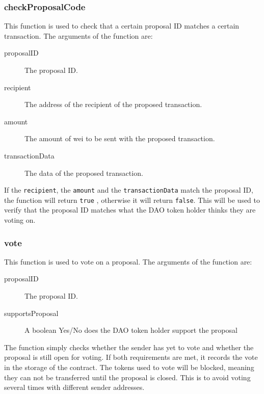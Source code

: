 \documentclass[9pt,oneside]{amsart}
\begin{document}
\begin{multicols}{2}
\subsubsection*{checkProposalCode}
This function is used to check that a certain proposal ID matches a certain transaction.
The arguments of the function are:
\begin{description}
 \item[proposalID] The proposal ID.
 \item[recipient] The address of the recipient of the proposed transaction.
 \item[amount] The amount of wei to be sent with the proposed transaction.
 \item[transactionData] The data of the proposed transaction.
\end{description}
If the \verb|recipient|,  the \verb|amount| and the \verb|transactionData| match the proposal ID, the function will return \verb|true| , otherwise it will return \verb|false|. This will be used to verify that the proposal ID matches what the DAO token holder thinks they are voting on.

\subsubsection*{vote}
This function is used to vote on a proposal. The arguments of the function are:
\begin{description}
 \item[proposalID] The proposal ID.
 \item[supportsProposal]  A boolean Yes/No does the DAO token holder support the proposal
\end{description}
The function simply checks whether the sender has yet to vote and whether the proposal is still open for voting. If both requirements are met, it records the vote in the storage of the contract. The tokens used to vote will be blocked, meaning they can not be transferred until the proposal is closed. This is to avoid voting several times with different sender addresses.


\end{multicols}
\end{document}
